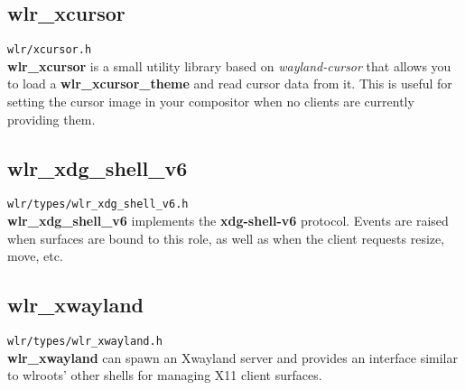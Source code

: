 \documentclass{article}
\newcommand{\code}[1]{\texttt{#1}}
\begin{document}
\subsection{wlr_xcursor}\label{wlr xcursor}

\code{wlr/xcursor.h}\\

\textbf{wlr_xcursor} is a small utility library based on \emph{wayland-cursor}
that allows you to load a \textbf{wlr_xcursor_theme} and read cursor data from
it. This is useful for setting the cursor image in your compositor when no
clients are currently providing them.

\subsection{wlr_xdg_shell_v6}\label{wlr xdg shell v6}

\code{wlr/types/wlr_xdg_shell_v6.h}\\

\textbf{wlr_xdg_shell_v6} implements the \textbf{xdg-shell-v6} protocol. Events
are raised when surfaces are bound to this role, as well as when the client
requests resize, move, etc.

\subsection{wlr_xwayland}\label{wlr xwayland}

\code{wlr/types/wlr_xwayland.h}\\

\textbf{wlr_xwayland} can spawn an Xwayland server and provides an interface
similar to wlroots' other shells for managing X11 client surfaces.
\end{document}
